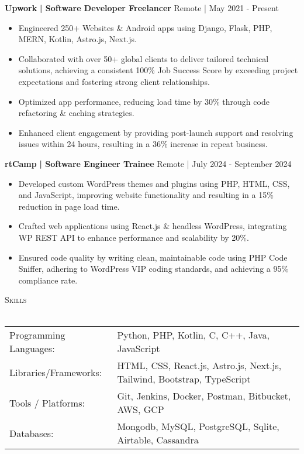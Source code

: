 \documentclass[a4paper]{article}
\newcommand{\lineunder} {
    \vspace*{-8pt} \\
    \hspace*{-18pt} \hrulefill \\
}
\newcommand{\header} [1] {
    {\hspace*{-18pt}\vspace*{6pt} \textsc{#1}}
    \vspace*{-6pt} \lineunder
}
\begin{document}
      \textbf{Upwork}\textbf{ | Software Developer  Freelancer} \hfill Remote | May 2021 - Present\\
          \vspace{-3mm}
\begin{itemize} \itemsep -3pt
\item[]  Engineered 250+ Websites \& Android apps using Django, Flask, PHP, MERN, Kotlin, Astro.js, Next.js.
\item[]  Collaborated with over 50+ global clients to deliver tailored technical solutions, achieving a consistent 100\% Job Success Score by exceeding project expectations and fostering strong client relationships.
\item[]  Optimized app performance, reducing load time by 30\% through code refactoring \& caching strategies.
\item[]  Enhanced client engagement by providing post-launch support and resolving issues within 24 hours, resulting in a 36\% increase in repeat business.
\end{itemize}
      \textbf{rtCamp}\textbf{ | Software Engineer Trainee} \hfill Remote | July 2024 - September 2024\\
          \vspace{-3mm}
\begin{itemize} \itemsep -3pt
\item[]  Developed custom WordPress themes and plugins using PHP, HTML, CSS, and JavaScript, improving website functionality and resulting in a 15\% reduction in page load time.
\item[]  Crafted web applications using React.js \& headless WordPress, integrating WP REST API to enhance performance and scalability by 20\%.
\item[]  Ensured code quality by writing clean, maintainable code using PHP Code Sniffer, adhering to WordPress VIP coding standards, and achieving a 95\% compliance rate.
\end{itemize}

%
%
  \header{Skills}
  \vspace{2mm}
  \begin{longtable}{p{4cm}p{12cm}}
  Programming Languages: & Python, PHP, Kotlin, C, C++, Java, JavaScript \\
  Libraries/Frameworks: & HTML, CSS, React.js, Astro.js, Next.js, Tailwind, Bootstrap, TypeScript \\
  Tools / Platforms: & Git, Jenkins, Docker, Postman, Bitbucket, AWS, GCP \\
  Databases: & Mongodb, MySQL, PostgreSQL, Sqlite, Airtable, Cassandra \\
  \end{longtable}
  \vspace{1mm}
\end{document}
